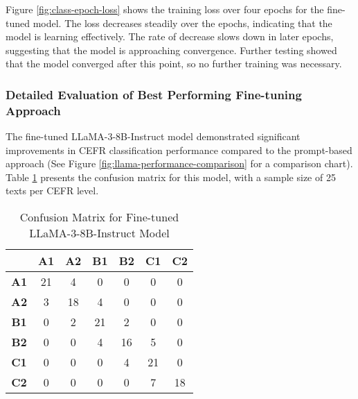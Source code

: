 Figure \ref{fig:class-epoch-loss} shows the training loss over four epochs for the fine-tuned model. The loss decreases steadily over the epochs, indicating that the model is learning effectively. The rate of decrease slows down in later epochs, suggesting that the model is approaching convergence. Further testing showed that the model converged after this point, so no further training was necessary.

\subsubsection*{Detailed Evaluation of Best Performing Fine-tuning Approach}
\label{sss:best_finetuning_evaluation}

The fine-tuned LLaMA-3-8B-Instruct model demonstrated significant improvements in CEFR classification performance compared to the prompt-based approach (See Figure \ref{fig:llama-performance-comparison} for a comparison chart). Table \ref{tab:finetuned_confusion_matrix} presents the confusion matrix for this model, with a sample size of 25 texts per CEFR level.

\begin{table}[ht]
    \centering
    \begin{tabular}{c|cccccc}
        & \textbf{A1} & \textbf{A2} & \textbf{B1} & \textbf{B2} & \textbf{C1} & \textbf{C2} \\
        \hline
        \textbf{A1} & \cellcolor[rgb]{0.28,0.83,0.28}21 & \cellcolor[rgb]{0.84,0.97,0.84}4 & \cellcolor[rgb]{1,1,1}0 & \cellcolor[rgb]{1,1,1}0 & \cellcolor[rgb]{1,1,1}0 & \cellcolor[rgb]{1,1,1}0 \\
        \textbf{A2} & \cellcolor[rgb]{0.9,0.98,0.9}3 & \cellcolor[rgb]{0.37,0.86,0.37}18 & \cellcolor[rgb]{0.84,0.97,0.84}4 & \cellcolor[rgb]{1,1,1}0 & \cellcolor[rgb]{1,1,1}0 & \cellcolor[rgb]{1,1,1}0 \\
        \textbf{B1} & \cellcolor[rgb]{1,1,1}0 & \cellcolor[rgb]{0.93,0.99,0.93}2 & \cellcolor[rgb]{0.28,0.83,0.28}21 & \cellcolor[rgb]{0.93,0.99,0.93}2 & \cellcolor[rgb]{1,1,1}0 & \cellcolor[rgb]{1,1,1}0 \\
        \textbf{B2} & \cellcolor[rgb]{1,1,1}0 & \cellcolor[rgb]{1,1,1}0 & \cellcolor[rgb]{0.84,0.97,0.84}4 & \cellcolor[rgb]{0.42,0.87,0.42}16 & \cellcolor[rgb]{0.8,0.96,0.8}5 & \cellcolor[rgb]{1,1,1}0 \\
        \textbf{C1} & \cellcolor[rgb]{1,1,1}0 & \cellcolor[rgb]{1,1,1}0 & \cellcolor[rgb]{1,1,1}0 & \cellcolor[rgb]{0.84,0.97,0.84}4 & \cellcolor[rgb]{0.28,0.83,0.28}21 & \cellcolor[rgb]{1,1,1}0 \\
        \textbf{C2} & \cellcolor[rgb]{1,1,1}0 & \cellcolor[rgb]{1,1,1}0 & \cellcolor[rgb]{1,1,1}0 & \cellcolor[rgb]{1,1,1}0 & \cellcolor[rgb]{0.72,0.95,0.72}7 & \cellcolor[rgb]{0.37,0.86,0.37}18 \\
    \end{tabular}
    \caption{Confusion Matrix for Fine-tuned LLaMA-3-8B-Instruct Model}
    \label{tab:finetuned_confusion_matrix}
\end{table}

